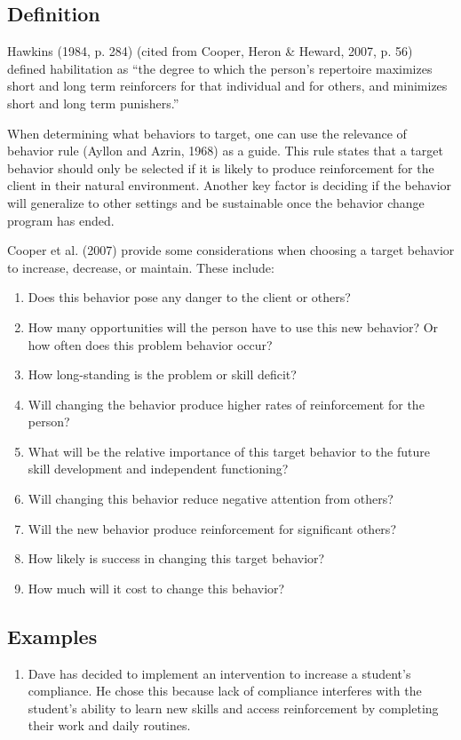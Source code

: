 \subsection{Definition}
Hawkins (1984, p. 284) (cited from Cooper, Heron \& Heward, 2007, p. 56) defined habilitation as ``the degree to which the person's repertoire maximizes short and long term reinforcers for that individual and for others, and minimizes short and long term punishers.''

When determining what behaviors to target, one can use the relevance of behavior rule (Ayllon and Azrin, 1968) as a guide. This rule states that a target behavior should only be selected if it is likely to produce reinforcement for the client in their natural environment. Another key factor is deciding if the behavior will generalize to other settings and be sustainable once the behavior change program has ended. 

Cooper et al. (2007) provide some considerations when choosing a target behavior to increase, decrease, or maintain. These include:
\begin{enumerate}
\item Does this behavior pose any danger to the client or others?
\item How many opportunities will the person have to use this new behavior? Or how often does this problem behavior occur?
\item How long-standing is the problem or skill deficit?
\item Will changing the behavior produce higher rates of reinforcement for the person?
\item What will be the relative importance of this target behavior to the future skill development and independent functioning?
\item Will changing this behavior reduce negative attention from others?
\item Will the new behavior produce reinforcement for significant others?
\item How likely is success in changing this target behavior?
\item How much will it cost to change this behavior?
\end{enumerate}
%
\subsection{Examples}
\begin{enumerate}
\item Dave has decided to implement an intervention to increase a student's compliance. He chose this because lack of compliance interferes with the student's ability to learn new skills and access reinforcement by completing their work and daily routines.
\end{enumerate}
%
